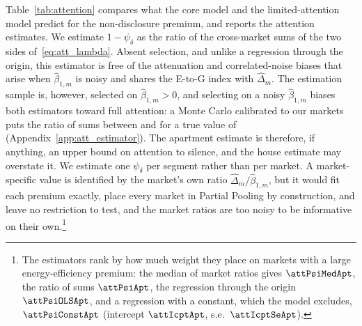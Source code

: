 Table~\ref{tab:attention} compares what the core model and the limited-attention model predict for the non-disclosure premium, and reports the attention estimates. We estimate $1-\psi_\delta$ as the ratio of the cross-market sums of the two sides of~\eqref{eq:att_lambda}. Absent selection, and unlike a regression through the origin, this estimator is free of the attenuation and correlated-noise biases that arise when $\hat\beta_{1,m}$ is noisy and shares the E-to-G index with $\hat\Delta_m$. The estimation sample is, however, selected on $\hat\beta_{1,m}>0$, and selecting on a noisy $\hat\beta_{1,m}$ biases both estimators toward full attention: a Monte Carlo calibrated to our markets puts the ratio of sums between \attMCromSelLo{} and \attMCromSelHi{} for a true value of \attMCtrue{} (Appendix~\ref{app:att_estimator}). The apartment estimate is therefore, if anything, an upper bound on attention to silence, and the house estimate may overstate it. We estimate one $\psi_\delta$ per segment rather than per market. A market-specific value is identified by the market's own ratio $\hat\Delta_m/\hat\beta_{1,m}$, but it would fit each premium exactly, place every market in Partial Pooling by construction, and leave no restriction to test, and the market ratios are too noisy to be informative on their own.\footnote{The estimators rank by how much weight they place on markets with a large energy-efficiency premium: the median of market ratios gives $\attPsiMedApt$, the ratio of sums $\attPsiApt$, the regression through the origin $\attPsiOLSApt$, and a regression with a constant, which the model excludes, $\attPsiConstApt$ (intercept $\attIcptApt$, s.e.\ $\attIcptSeApt$).}

